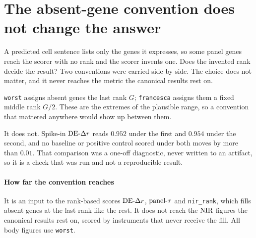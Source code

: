 %
\section{The absent-gene convention does not change the answer}
\label{sec:app-convention}

\begin{question}
A predicted cell sentence lists only the genes it expresses, so some panel genes
reach the scorer with no rank and the scorer invents one. Does the invented rank
decide the result? Two conventions were carried side by side. The choice does
not matter, and it never reaches the metric the canonical results rest on.
\end{question}

\noindent
\texttt{worst} assigns absent genes the last rank $G$; \texttt{francesca}
assigns them a fixed middle rank $G/2$. These are the extremes of the plausible
range, so a convention that mattered anywhere would show up between them.

It does not. Spike-in $\textrm{DE-}\Delta r$ reads $0.952$ under the first and $0.954$ under
the second, and no baseline or positive control scored under both moves by more
than $0.01$. That comparison was a one-off diagnostic, never written to an
artifact, so it is a check that was run and not a reproducible result.

\paragraph{How far the convention reaches} It is an input to the rank-based
scores $\textrm{DE-}\Delta r$, $\textrm{panel-}\tau$ and \texttt{nir\_rank}, which fills absent genes at
the last rank like the rest. It does not reach the $\textrm{NIR}$
figures the canonical results rest on, scored by instruments that never receive
the fill. All body figures use \texttt{worst}.

